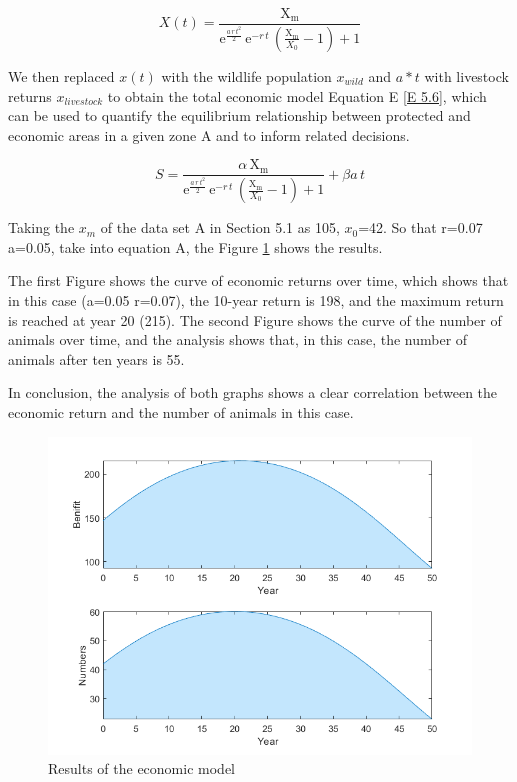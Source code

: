 \documentclass{mcmthesis}
\numberwithin{figure}{section}
\numberwithin{table}{section}
\numberwithin{equation}{section}
\begin{document}
\large{
\begin{equation}
X(t)=\frac{\text{X}_{\text{m}}}{\text{e}^{\frac{a\,r\,t^2}{2}}\,\text{e}^{-r\,t}\,\left( \frac{\text{X}_{\text{m}}}{X_0}-1 \right) +1}
	\label{E 5.5}
\end{equation}
}

We then replaced $x(t)$ with the wildlife population $x_{wild}$ and $a*t$ with livestock returns $x_{livestock}$ to obtain the total economic model Equation E \ref{E 5.6}, which can be used to quantify the equilibrium relationship between protected and economic areas in a given zone A and to inform related decisions.

\large{
\begin{equation}
S=\frac{\alpha \,\text{X}_{\text{m}}}{\text{e}^{\frac{a\,r\,t^2}{2}}\,\text{e}^{-r\,t}\,\left( \frac{\text{X}_{\text{m}}}{X_0}-1 \right) +1}+\beta a\,t
\label{E 5.6}
\end{equation}
}

Taking the $x_m$ of the data set A in Section 5.1 as 105, $x_0$=42. So that r=0.07 a=0.05, take into equation A, the Figure \ref{F 5.5} shows the results.


The first Figure shows the curve of economic returns over time, which shows that in this case (a=0.05 r=0.07), the 10-year return is 198, and the maximum return is reached at year 20 (215). The second Figure shows the curve of the number of animals over time, and the analysis shows that, in this case, the number of animals after ten years is 55.

In conclusion, the analysis of both graphs shows a clear correlation between the economic return and the number of animals in this case.

\begin{figure}
	\centering
	\includegraphics[width=0.5\linewidth]{"figures/F 5.5"}
	\caption{Results of the economic model}
	\label{F 5.5}
\end{figure}
\end{document}
